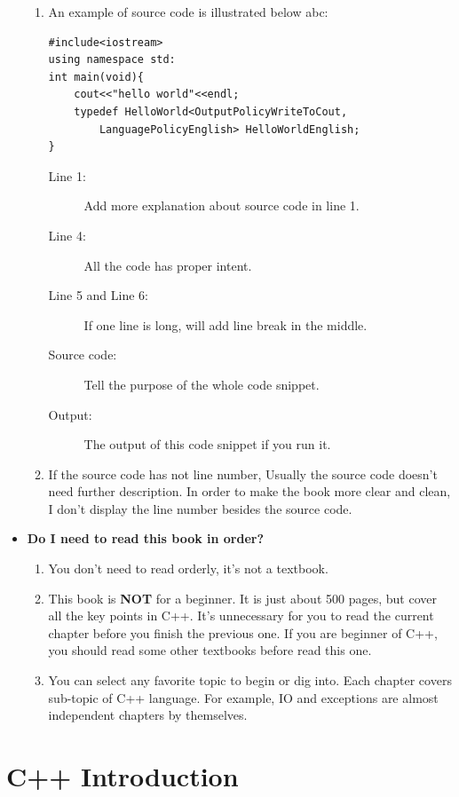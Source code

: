\documentclass[a4paper,11pt,twoside]{book}
\begin{document}
\begin{itemize}
\begin{enumerate}
		\item An example of source code is illustrated below abc:
		
\begin{lstlisting}
#include<iostream>
using namespace std:
int main(void){
	cout<<"hello world"<<endl;
	typedef HelloWorld<OutputPolicyWriteToCout, 
		LanguagePolicyEnglish> HelloWorldEnglish;
}
\end{lstlisting}

\begin{description}
	\item[Line 1:] Add more explanation about source code in line 1.
	\item[Line 4:] All the code has proper intent.
	\item[Line 5 and Line 6:] If one line is long, will add line break in the middle. 
	\item[Source code:] Tell the purpose of the whole code snippet.
	\item[Output:] The output of this code snippet if you run it.
\end{description}

		\item If the source code has not line number, Usually the source code doesn't need further description. In order to make the book more clear and clean, I don't display the line number besides the source code.
	\end{enumerate}

	\item \textbf{Do I need to read this book in order?}
	\begin{enumerate}
	\item You don't need to read orderly, it's not a textbook.

	\item This book is \textbf{NOT} for a beginner. It is just about 500 pages, but cover all the key points in C++. It's unnecessary for you to read the current chapter before you finish the previous one. If you are beginner of C++, you should read some other textbooks before read this one.

	\item You can select any favorite topic to begin or dig into. Each chapter covers sub-topic of C++ language. For example, IO and exceptions are almost independent chapters by themselves.
	\end{enumerate}

\end{itemize}

\chapter{C++ Introduction}
\end{document}
